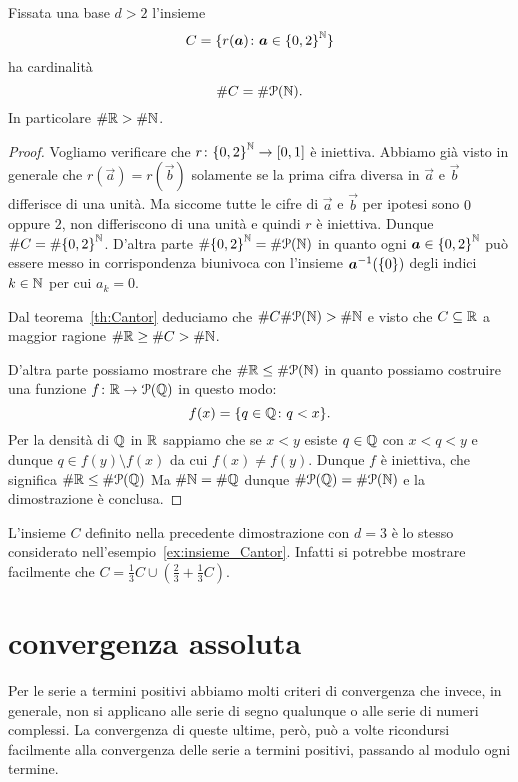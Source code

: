 \begin{theorem}[Cantor]
  \label{th:cantor_secondo}
Fissata una base $d>2$ l'insieme 
\[
  C = \{r(\boldsymbol a)\colon \boldsymbol a \in {\left\{ 0,2 \right\}}^{\mathbb N}\}
\]
ha cardinalità
\[
\# C = \# \mathcal P({\mathbb N}).
\]
In particolare $\#{\mathbb R} > \#{\mathbb N}$.
\end{theorem}
%
\begin{proof}
Vogliamo verificare che $r\colon {\left\{ 0,2 \right\}}^{\mathbb N} \to \left[0,1\right]$
è iniettiva.
Abbiamo già visto in generale che $r(\vec a) = r(\vec b)$ solamente 
se la prima cifra diversa in $\vec a$ e $\vec b$ differisce di una unità.
Ma siccome tutte le cifre di $\vec a$ e $\vec b$ per ipotesi sono $0$ oppure 
$2$, non differiscono di una unità e quindi $r$ è iniettiva.
Dunque $\# C = \#{\left\{ 0,2 \right\}}^{\mathbb N}$.
D'altra parte $\#{\left\{ 0,2 \right\}}^{\mathbb N} = \#\mathcal P({\mathbb N})$ in quanto 
ogni $\boldsymbol a \in {\left\{ 0,2 \right\}}^{\mathbb N}$ può essere messo in corrispondenza 
biunivoca con l'insieme $\boldsymbol a^{-1}({\left\{ 0 \right\}})$ degli indici $k\in {\mathbb N}$
per cui $a_k=0$.

Dal teorema~\ref{th:Cantor} deduciamo che $\# C \#\mathcal P({\mathbb N}) > \#{\mathbb N}$ 
e visto che $C\subseteq {\mathbb R}$ a maggior ragione $\# {\mathbb R} \ge \# C >\#{\mathbb N}$.

D'altra parte possiamo mostrare che $\#{\mathbb R} \le \# \mathcal P({\mathbb N})$
in quanto possiamo costruire una funzione $f\colon {\mathbb R} \to \mathcal P({\mathbb Q})$
in questo modo:
\[
f(x) = {\left\{ q\in {\mathbb Q}\colon q<x \right\}}.
\]
Per la densità di ${\mathbb Q}$ in ${\mathbb R}$ sappiamo che se $x<y$ 
esiste $q\in {\mathbb Q}$ con $x<q<y$ e dunque $q\in f(y)\setminus f(x)$ 
da cui $f(x)\neq f(y)$. 
Dunque $f$ è iniettiva, che significa $\#{\mathbb R}\le \# \mathcal P({\mathbb Q})$
Ma $\#{\mathbb N} = \#{\mathbb Q}$ dunque $\#\mathcal P({\mathbb Q}) = \#\mathcal P({\mathbb N})$ 
e la dimostrazione è conclusa.
\end{proof}

L'insieme $C$ definito nella precedente dimostrazione con $d=3$ 
è lo stesso 
% 
considerato nell'esempio~\ref{ex:insieme_Cantor}.
Infatti si potrebbe mostrare facilmente che 
$C=\frac 1 3 C \cup (\frac 2 3 + \frac 1 3 C)$.

\section{convergenza assoluta}

Per le serie a termini positivi abbiamo molti criteri di convergenza
che invece, in generale, non si applicano alle serie di segno qualunque
o alle serie di numeri complessi.
La convergenza di queste ultime, però, può a volte ricondursi
facilmente
alla
convergenza delle serie a termini positivi, passando al modulo
ogni termine.

